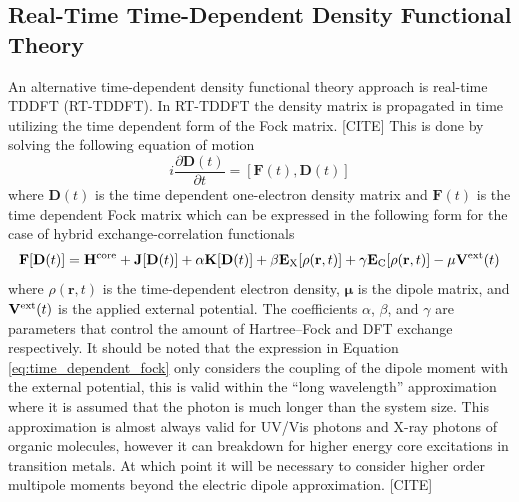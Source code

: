 \documentclass[final]{emory}
\begin{document}
\subsection{Real-Time Time-Dependent Density Functional Theory}
An alternative time-dependent density functional theory approach is real-time TDDFT (RT-TDDFT). In RT-TDDFT the density matrix is propagated in time utilizing the time dependent form of the Fock matrix. [CITE] This is done by solving the following equation of motion
\begin{equation}
\label{eq:real_time_EOM}
i \frac{\partial \mathbf{D}(t)}{\partial t} = [\mathbf{F}(t), \mathbf{D}(t)]
\end{equation}
where $\mathbf{D}(t)$ is the time dependent one-electron density matrix and $\mathbf{F}(t)$ is the time dependent Fock matrix which can be expressed in the following form for the case of hybrid exchange-correlation functionals
\begin{equation}
\label{eq:time_dependent_fock}
\mathbf{F}[\mathbf{D}(t)] = \mathbf{H}^{\rm core} + \mathbf{J}[\mathbf{D}(t)] + \alpha\mathbf{K}[\mathbf{D}(t)] + \beta \mathbf{E}_{\rm X}[\rho(\mathbf{r}, t)] + \gamma \mathbf{E}_{\rm C}[\rho(\mathbf{r}, t)] - \mathbf{\mu} \mathbf{V}^{\rm ext}(t)
\end{equation}
where $\rho(\mathbf{r}, t)$ is the time-dependent electron density, $\mathbf{\mu}$ is the dipole matrix, and $\mathbf{V}^{\rm ext}(t)$ is the applied external potential. The coefficients $\alpha$, $\beta$, and $\gamma$ are parameters that control the amount of Hartree--Fock and DFT exchange respectively. It should be noted that the expression in Equation \ref{eq:time_dependent_fock} only considers the coupling of the dipole moment with the external potential, this is valid within the ``long wavelength'' approximation where it is assumed that the photon is much longer than the system size. This approximation is almost always valid for UV/Vis photons and X-ray photons of organic molecules, however it can breakdown for higher energy core excitations in transition metals. At which point it will be necessary to consider higher order multipole moments beyond the electric dipole approximation. [CITE]
\end{document}
